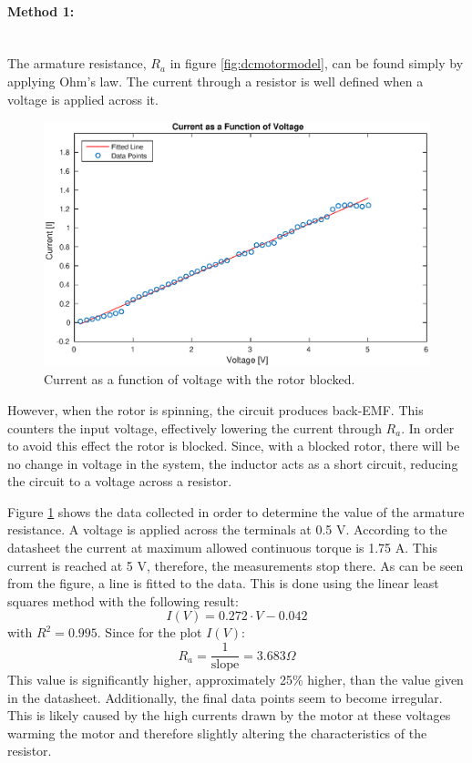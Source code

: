 \paragraph{Method 1:}~\\
The armature resistance, $R_a$ in figure \ref{fig:dcmotormodel}, can be found simply by applying Ohm's law.
The current through a resistor is well defined when a voltage is applied across it.

\begin{figure}[!h]
	\centering
	\includegraphics[width=\linewidth]{graphics/raplot}
	\caption{Current as a function of voltage with the rotor blocked.}
	\label{fig:raplot}
\end{figure}

However, when the rotor is spinning, the circuit produces back-EMF.
This counters the input voltage, effectively lowering the current through $R_a$.
In order to avoid this effect the rotor is blocked.
Since, with a blocked rotor, there will be no change in voltage in the system, the inductor acts as a short circuit, reducing the circuit to a voltage across a resistor. 

Figure \ref{fig:raplot} shows the data collected in order to determine the value of the armature resistance.
A voltage is applied across the terminals at 0.5 V.
According to the datasheet \cite{pittmann} the current at maximum allowed continuous torque is 1.75 A.
This current is reached at 5 V, therefore, the measurements stop there.
As can be seen from the figure, a line is fitted to the data.
This is done using the linear least squares method with the following result:
$$I(V)=0.272\cdot V-0.042$$
with $R^2=0.995$.
Since for the plot $I(V)$:
$$R_a = \frac{1}{\text{slope}} = 3.683\Omega$$
This value is significantly higher, approximately 25\% higher, than the value given in the datasheet.
Additionally, the final data points seem to become irregular.
This is likely caused by the high currents drawn by the motor at these voltages warming the motor and therefore slightly altering the characteristics of the resistor.

